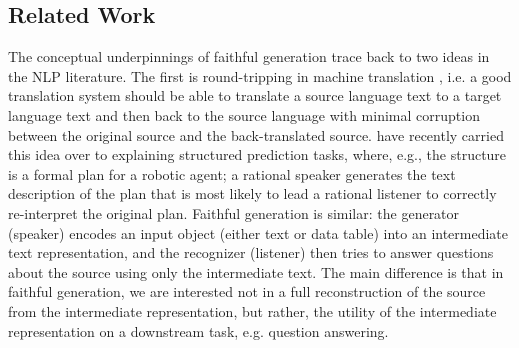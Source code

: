 \subsection{Related Work}


The conceptual underpinnings of faithful generation trace back to two
ideas in the NLP literature. The first is round-tripping in machine translation
\cite{somers2005round,rapp2009back}, i.e. a good translation system should be able to translate
a source language text to a target language text and then back to the source
language with minimal corruption between the original source and the 
back-translated source. \cite{andreas2016reasoning} have recently carried 
this idea 
over to explaining structured prediction tasks, where, e.g., 
the structure is a 
formal plan for a robotic agent; a rational speaker  generates the text
description of the plan that is most likely to lead a rational listener 
to correctly re-interpret the original plan. Faithful generation is similar:
the generator (speaker) 
 encodes an 
input object
(either text or data table) into 
an intermediate text representation, and the recognizer (listener) then tries to 
answer questions about the source using only the intermediate text.
The main difference is that in faithful generation, we are interested not in
a full reconstruction of the source from the intermediate representation, but
rather, the utility of the intermediate representation on a downstream task, 
e.g. question answering.


